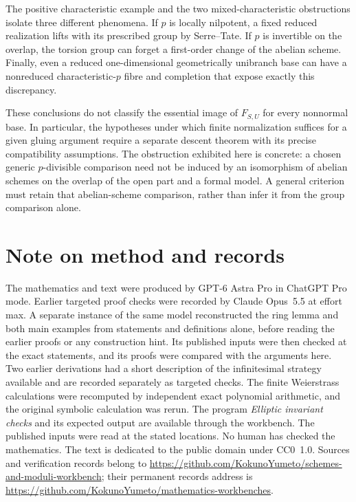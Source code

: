 \documentclass[11pt]{article}
\theoremstyle{remark}\newtheorem{remark}[theorem]{Remark}
\newcommand{\workbenchurl}{https://github.com/KokunoYumeto/schemes-and-moduli-workbench}
\newcommand{\recordurl}{https://github.com/KokunoYumeto/mathematics-workbenches}
\begin{document}
The positive characteristic example and the two mixed-characteristic obstructions isolate three different phenomena. If $p$ is locally nilpotent, a fixed reduced realization lifts with its prescribed group by Serre--Tate. If $p$ is invertible on the overlap, the torsion group can forget a first-order change of the abelian scheme. Finally, even a reduced one-dimensional geometrically unibranch base can have a nonreduced characteristic-$p$ fibre and completion that expose exactly this discrepancy.

These conclusions do not classify the essential image of $F_{S,U}$ for every nonnormal base. In particular, the hypotheses under which finite normalization suffices for a given gluing argument require a separate descent theorem with its precise compatibility assumptions. The obstruction exhibited here is concrete: a chosen generic $p$-divisible comparison need not be induced by an isomorphism of abelian schemes on the overlap of the open part and a formal model. A general criterion must retain that abelian-scheme comparison, rather than infer it from the group comparison alone.

\section*{Note on method and records}

The mathematics and text were produced by GPT-6 Astra Pro in ChatGPT Pro mode. Earlier targeted proof checks were recorded by Claude Opus~5.5 at effort max. A separate instance of the same model reconstructed the ring lemma and both main examples from statements and definitions alone, before reading the earlier proofs or any construction hint. Its published inputs were then checked at the exact statements, and its proofs were compared with the arguments here. Two earlier derivations had a short description of the infinitesimal strategy available and are recorded separately as targeted checks. The finite Weierstrass calculations were recomputed by independent exact polynomial arithmetic, and the original symbolic calculation was rerun. The program \emph{Elliptic invariant checks} and its expected output are available through the workbench. The published inputs were read at the stated locations. No human has checked the mathematics. The text is dedicated to the public domain under CC0~1.0. Sources and verification records belong to \url{\workbenchurl}; their permanent records address is \url{\recordurl}.
\end{document}
